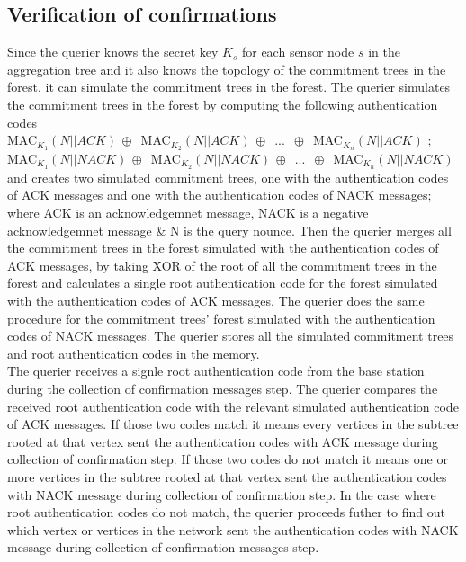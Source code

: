 \subsection{Verification of confirmations}
Since the querier knows the secret key $K_{s}$ for each sensor node $s$ in the aggregation tree and it also knows the topology of the commitment trees in the forest, it can simulate the commitment trees in the forest. The querier simulates the commitment trees in the forest by computing the following authentication codes\\

MAC$_{K_{1}}(N||ACK)\,\oplus\,$ 
MAC$_{K_{2}}(N||ACK)\,\oplus\,$
...
$\,\oplus\,$
MAC$_{K_{n}}(N||ACK)$ ; \\
MAC$_{K_{1}}(N||NACK)\,\oplus\,$ 
MAC$_{K_{2}}(N||NACK)\,\oplus\,$
...
$\,\oplus\,$
MAC$_{K_{n}}(N||NACK)$  \\


and creates two simulated commitment trees, one with the authentication codes of ACK messages and one with the authentication codes of NACK messages; where ACK is an acknowledgemnet message, NACK is a negative acknowledgemnet message \& N is the query nounce. Then the querier merges all the commitment trees in the forest simulated with the authentication codes of ACK messages, by taking XOR of the root of all the commitment trees in the forest and calculates a single root authentication code for the forest simulated with the authentication codes of ACK messages. The querier does the same procedure for the commitment trees' forest simulated with the authentication codes of NACK messages. The querier stores all the simulated commitment trees and root authentication codes in the memory. \\


The querier receives a signle root authentication code from the base station during the collection of confirmation messages step. The querier compares the received root authentication code with the relevant simulated authentication code of ACK messages. If those two codes match it means every vertices in the subtree rooted at that vertex sent the authentication codes with ACK message during collection of confirmation step. If those two codes do not match it means one or more vertices in the subtree rooted at that vertex sent the authentication codes with NACK message during collection of confirmation step. In the case where root authentication codes do not match, the querier proceeds futher to find out which vertex or vertices in the network sent the authentication codes with NACK message during collection of confirmation messages step.\\


